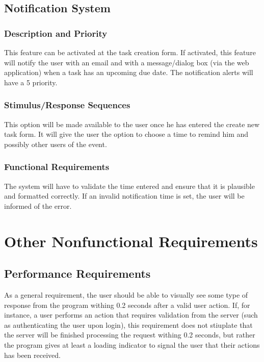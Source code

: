 \documentclass{article}
\begin{document}
\subsection{Notification System}
\subsubsection{Description and Priority}
This feature can be activated at the task creation form. 
If activated, this feature will notify the user with an email and with a message/dialog box (via the web application) when a task has an upcoming due date. The notification alerts will have a 5 priority.

\subsubsection{Stimulus/Response Sequences}
This option will be made available to the user once he has entered the create new task form. 
It will give the user the option to choose a time to remind him and possibly other users of the event. 
 
\subsubsection{Functional Requirements}
The system will have to validate the time entered and ensure that it is plausible and formatted correctly.  If an invalid notification time is set, the user will be informed of the error. 

\newpage
\section{Other Nonfunctional Requirements}
\subsection{Performance Requirements}
As a general requirement, the user should be able to visually see some type of response from the program withing 0.2 seconds after a valid user action.  
If, for instance, a user performs an action that requires validation from the server (such as authenticating the user upon login), this requirement does not stiuplate that the server will be finished processing the request withing 0.2 seconds, but rather the program gives at least a loading indicator to signal the user that their actions has been received.
\end{document}
